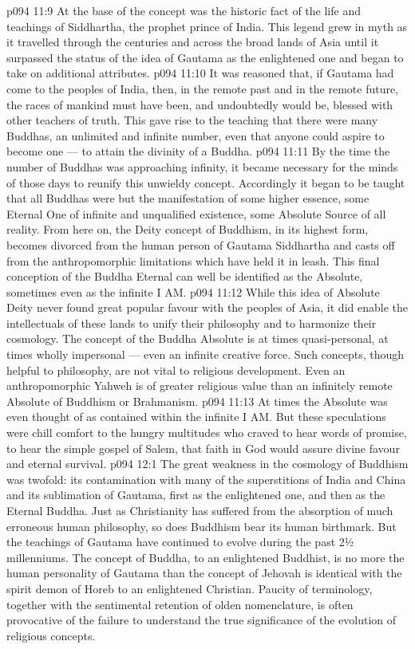 \vs p094 11:9 \bibnobreakspace {} At the base of the concept was the historic fact of the life and teachings of Siddhartha, the prophet prince of India. This legend grew in myth as it travelled through the centuries and across the broad lands of Asia until it surpassed the status of the idea of Gautama as the enlightened one and began to take on additional attributes.
\vs p094 11:10 \bibnobreakspace {} It was reasoned that, if Gautama had come to the peoples of India, then, in the remote past and in the remote future, the races of mankind must have been, and undoubtedly would be, blessed with other teachers of truth. This gave rise to the teaching that there were many Buddhas, an unlimited and infinite number, even that anyone could aspire to become one --- to attain the divinity of a Buddha.
\vs p094 11:11 \bibnobreakspace {} By the time the number of Buddhas was approaching infinity, it became necessary for the minds of those days to reunify this unwieldy concept. Accordingly it began to be taught that all Buddhas were but the manifestation of some higher essence, some Eternal One of infinite and unqualified existence, some Absolute Source of all reality. From here on, the Deity concept of Buddhism, in its highest form, becomes divorced from the human person of Gautama Siddhartha and casts off from the anthropomorphic limitations which have held it in leash. This final conception of the Buddha Eternal can well be identified as the Absolute, sometimes even as the infinite I AM.
\vs p094 11:12 \pc While this idea of Absolute Deity never found great popular favour with the peoples of Asia, it did enable the intellectuals of these lands to unify their philosophy and to harmonize their cosmology. The concept of the Buddha Absolute is at times quasi\hyp{}personal, at times wholly impersonal --- even an infinite creative force. Such concepts, though helpful to philosophy, are not vital to religious development. Even an anthropomorphic Yahweh is of greater religious value than an infinitely remote Absolute of Buddhism or Brahmanism.
\vs p094 11:13 At times the Absolute was even thought of as contained within the infinite I AM. But these speculations were chill comfort to the hungry multitudes who craved to hear words of promise, to hear the simple gospel of Salem, that faith in God would assure divine favour and eternal survival.
\vs p094 12:1 The great weakness in the cosmology of Buddhism was twofold: its contamination with many of the superstitions of India and China and its sublimation of Gautama, first as the enlightened one, and then as the Eternal Buddha. Just as Christianity has suffered from the absorption of much erroneous human philosophy, so does Buddhism bear its human birthmark. But the teachings of Gautama have continued to evolve during the past 2½ millenniums. The concept of Buddha, to an enlightened Buddhist, is no more the human personality of Gautama than the concept of Jehovah is identical with the spirit demon of Horeb to an enlightened Christian. Paucity of terminology, together with the sentimental retention of olden nomenclature, is often provocative of the failure to understand the true significance of the evolution of religious concepts.
